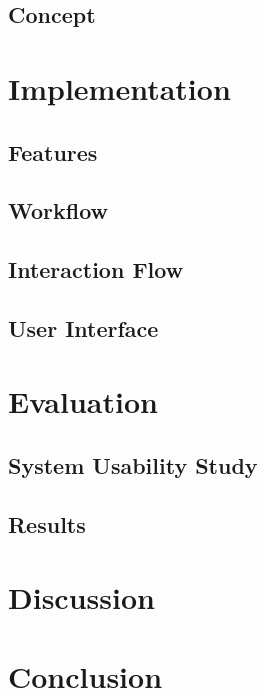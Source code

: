 \documentclass[twoside, parskip]{VRThesis} %
\begin{document}
\section{\label{sec::Concept}Concept}


\chapter{\label{chap::Implementation}Implementation}

\section{\label{sec::Features}Features}

\section{\label{sec::Workflow}Workflow}

\section{\label{sec::InteractionFlow}Interaction Flow}

\section{\label{sec::UserInterface}User Interface}


\chapter{\label{chap::Evaluation}Evaluation}

\section{\label{sec::Methology}System Usability Study}

\section{\label{sec::Results}Results}


\chapter{\label{chap::Discussion}Discussion}


\chapter{\label{chap::Conclusion}Conclusion}




%
\end{document}
